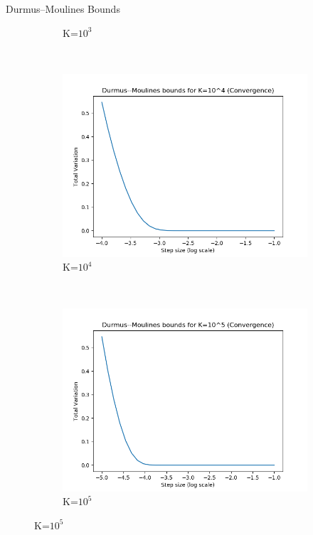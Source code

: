 \documentclass[aspectratio=169]{beamer}
\begin{document}
\begin{frame}{Durmus--Moulines Bounds}
\begin{figure}[h]
\begin{subfigure}[b]{0.23\textwidth}
        \caption{K=$10^3$}
    \end{subfigure}
    ~ %
    \begin{subfigure}[b]{0.23\textwidth}
        \includegraphics[width=\textwidth]{ConvergenceK1e4.png}
        \caption{K=$10^4$}
    \end{subfigure}
    ~
    \begin{subfigure}[b]{0.23\textwidth}
        \includegraphics[width=\textwidth]{ConvergenceK1e5.png}
        \caption{K=$10^5$}
    \end{subfigure}
    
\end{figure}
\end{frame}
\end{document}
